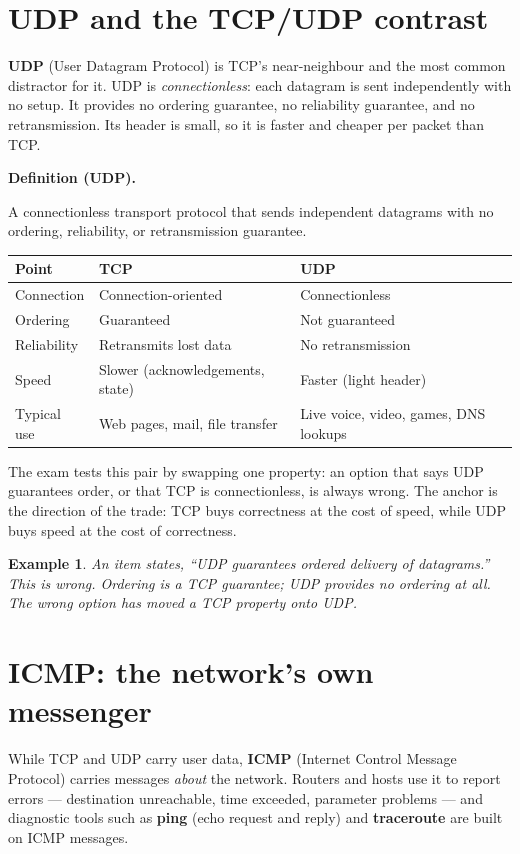 \documentclass[11pt]{article}
\newtheorem{example}{Example}[section]
\newenvironment{definitionbox}[1]{%
  \par\noindent\textbf{Definition (#1).}\ \itshape
}{\par\vspace{0.3em}}
\begin{document}
\section{UDP and the TCP/UDP contrast}
\textbf{UDP} (User Datagram Protocol) is TCP's near-neighbour and the most
common distractor for it. UDP is \emph{connectionless}: each datagram is sent
independently with no setup. It provides no ordering guarantee, no
reliability guarantee, and no retransmission. Its header is small, so it is
faster and cheaper per packet than TCP.

\begin{definitionbox}{UDP}
A connectionless transport protocol that sends independent datagrams with no
ordering, reliability, or retransmission guarantee.
\end{definitionbox}

\begin{center}
\begin{tabular}{p{}p{}p{}}
\toprule
\textbf{Point} & \textbf{TCP} & \textbf{UDP} \\
\midrule
Connection & Connection-oriented & Connectionless \\
Ordering & Guaranteed & Not guaranteed \\
Reliability & Retransmits lost data & No retransmission \\
Speed & Slower (acknowledgements, state) & Faster (light header) \\
Typical use & Web pages, mail, file transfer & Live voice, video, games, DNS lookups \\
\bottomrule
\end{tabular}
\end{center}

The exam tests this pair by swapping one property: an option that says UDP
guarantees order, or that TCP is connectionless, is always wrong. The anchor
is the direction of the trade: TCP buys correctness at the cost of speed,
while UDP buys speed at the cost of correctness.

\begin{example}
An item states, ``UDP guarantees ordered delivery of datagrams.'' This is
wrong. Ordering is a TCP guarantee; UDP provides no ordering at all. The
wrong option has moved a TCP property onto UDP.
\end{example}

\section{ICMP: the network's own messenger}
While TCP and UDP carry user data, \textbf{ICMP} (Internet Control Message
Protocol) carries messages \emph{about} the network. Routers and hosts use it
to report errors --- destination unreachable, time exceeded, parameter
problems --- and diagnostic tools such as \textbf{ping} (echo request and
reply) and \textbf{traceroute} are built on ICMP messages.
\end{document}
